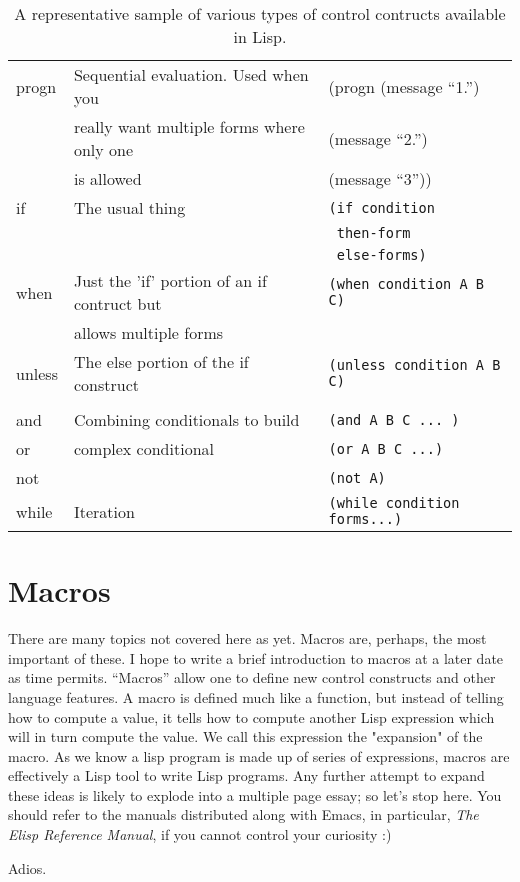 \documentclass[10pt]{article}
\begin{document}
\begin{table}[tbh]
  \centering
  \begin{tabular}{|l|l|l|} \hline
    progn & Sequential evaluation.  Used when you & (progn (message ``1.'') \\ 
          & really want multiple forms  where only one &    (message ``2.'') \\
          & is allowed  & (message ``3''))\\ \hline

    if    & The usual thing       & \texttt{(if condition} \\
          &                       & \texttt{    then-form } \\
          &                       & \texttt{   else-forms)} \\ \hline

    when  & Just the 'if' portion of an if contruct but 
          & \texttt{(when condition A B C)} \\
          & allows multiple forms &  \\ \hline

    unless & The else portion of the if construct 
           & \texttt{(unless condition A B C)} \\ 

           & & \\ \hline

    and    & Combining conditionals to build & \texttt{(and A B C ... )} \\
    or     & complex conditional & \texttt{(or A B C ...)} \\
    not    &                             & \texttt{(not A)} \\ \hline

    while  & Iteration & \texttt{(while condition forms...)} \\ \hline

  \end{tabular}
  \caption{A representative sample of various types of control contructs
          available in Lisp.}
  \label{tab:controls}
\end{table}

\section{Macros}

There are many topics not covered here as yet.  Macros are, perhaps, the most
important of these.  I hope to write a brief introduction to macros at a later
date as time permits.  ``Macros'' allow one to define new control constructs
and other language features.  A macro is defined much like a function, but
instead of telling how to compute a value, it tells how to compute another Lisp
expression which will in turn compute the value.  We call this expression the
"expansion" of the macro.  As we know a lisp program is made up of series of
expressions, macros are effectively a Lisp tool to write Lisp programs.  Any
further attempt to expand these ideas is likely to explode into a multiple page
essay; so let's stop here.  You should refer to the manuals distributed along
with Emacs, in particular, \textit{The Elisp Reference Manual}, if you cannot
control your curiosity :)

Adios.
\end{document}
